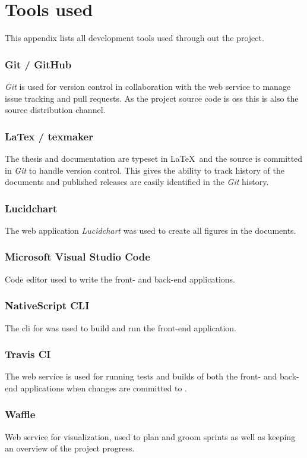 \chapter{Tools used}
This appendix lists all development tools used through out the project.

\subsection*{Git / GitHub}
\textit{Git} is used for version control in collaboration with the web service  to manage issue tracking and pull requests.
As the project source code is \gls{oss} this is also the source distribution channel.

\subsection*{LaTex / texmaker}
The thesis and documentation are typeset in \LaTeX\ and the source is committed in \textit{Git} to handle version control.
This gives the ability to track history of the documents and published releases are easily identified in the \textit{Git} history.

\subsection*{Lucidchart}
The web application \textit{Lucidchart} was used to create all figures in the documents.

\subsection*{Microsoft Visual Studio Code}
Code editor used to write the front- and back-end applications.

\subsection*{NativeScript CLI}
The \gls{cli} for  was used to build and run the front-end application.

\subsection*{Travis CI}
The  web service  is used for running tests and builds of both the front- and back-end applications when changes are committed to .

\subsection*{Waffle}
Web service for  visualization, used to plan and groom sprints as well as keeping an overview of the project progress.
